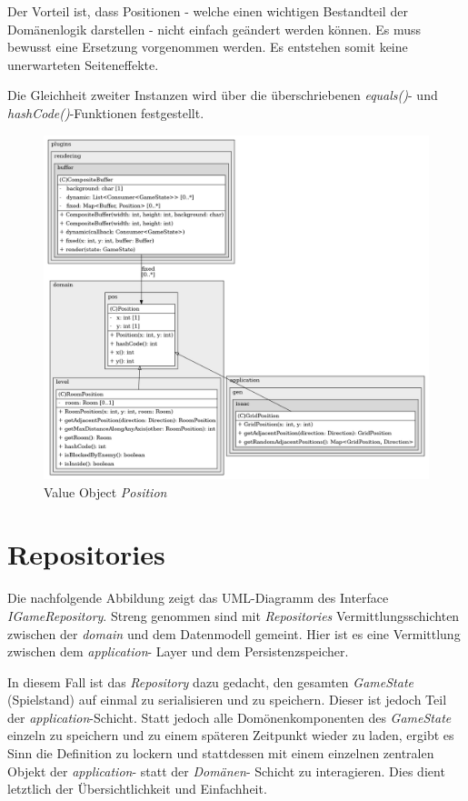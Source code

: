 Der Vorteil ist, dass Positionen - welche einen wichtigen Bestandteil
der Domänenlogik darstellen - nicht einfach geändert werden können.
Es muss bewusst eine Ersetzung vorgenommen werden. Es entstehen somit
keine unerwarteten Seiteneffekte.

Die Gleichheit zweiter Instanzen wird über die überschriebenen
\textit{equals()}- und \textit{hashCode()}-Funktionen festgestellt.

\vspace{0.5cm}
\begin{figure}[H]
    \centering
    \includegraphics[width=0.9\linewidth]{Bilder/Visualisierung/Position_structure.png}
    \caption{Value Object \textit{Position}}
\end{figure}

\section{Repositories}
Die nachfolgende Abbildung zeigt das UML-Diagramm des Interface
\textit{IGameRepository}. Streng genommen sind mit \textit{Repositories}
Vermittlungsschichten zwischen der \textit{domain} und dem Datenmodell
gemeint. Hier ist es eine Vermittlung zwischen dem \textit{application}-
Layer und dem Persistenzspeicher. 

In diesem Fall ist das \textit{Repository} dazu gedacht, den gesamten
\textit{GameState} (Spielstand) auf einmal zu serialisieren und zu
speichern. Dieser ist jedoch Teil der \textit{application}-Schicht.
Statt jedoch alle Domönenkomponenten des \textit{GameState} einzeln
zu speichern und zu einem späteren Zeitpunkt wieder zu laden, ergibt
es Sinn die Definition zu lockern und stattdessen mit einem einzelnen
zentralen Objekt der \textit{application}- statt der \textit{Domänen}-
Schicht zu interagieren. Dies dient letztlich der Übersichtlichkeit
und Einfachheit.


